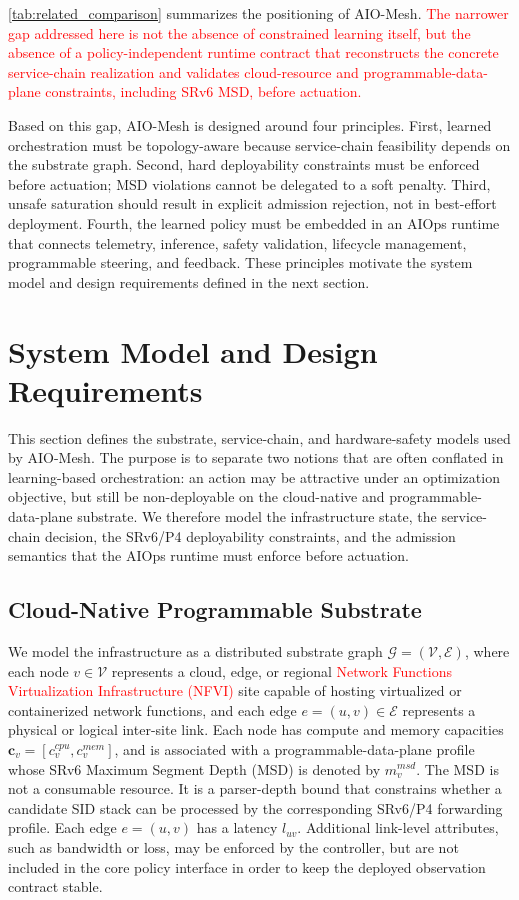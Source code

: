 \documentclass[final,5p]{elsarticle}
\newcommand{\rev}[1]{\textcolor{red}{#1}}
\begin{document}
\autoref{tab:related_comparison} summarizes the positioning of AIO-Mesh. \rev{The narrower gap addressed here is not the absence of constrained learning itself, but the absence of a policy-independent runtime contract that reconstructs the concrete service-chain realization and validates cloud-resource and programmable-data-plane constraints, including SRv6 MSD, before actuation.}

Based on this gap, AIO-Mesh is designed around four principles. First, learned orchestration must be topology-aware because service-chain feasibility depends on the substrate graph. Second, hard deployability constraints must be enforced before actuation; MSD violations cannot be delegated to a soft penalty. Third, unsafe saturation should result in explicit admission rejection, not in best-effort deployment. Fourth, the learned policy must be embedded in an AIOps runtime that connects telemetry, inference, safety validation, lifecycle management, programmable steering, and feedback. These principles motivate the system model and design requirements defined in the next section.


\section{System Model and Design Requirements}
\label{sec:system_model}

This section defines the substrate, service-chain, and hardware-safety models used by AIO-Mesh. The purpose is to separate two notions that are often conflated in learning-based orchestration: an action may be attractive under an optimization objective, but still be non-deployable on the cloud-native and programmable-data-plane substrate. We therefore model the infrastructure state, the service-chain decision, the SRv6/P4 deployability constraints, and the admission semantics that the AIOps runtime must enforce before actuation.

\subsection{Cloud-Native Programmable Substrate}
\label{subsec:infrastructure_model}

We model the infrastructure as a distributed substrate graph $ \mathcal{G}=(\mathcal{V},\mathcal{E})$,
where each node \(v\in\mathcal{V}\) represents a cloud, edge, or regional \rev{Network Functions Virtualization Infrastructure (NFVI)} site capable of hosting virtualized or containerized network functions, and each edge \(e=(u,v)\in\mathcal{E}\) represents a physical or logical inter-site link. Each node has compute and memory capacities $\mathbf{c}_v=\left[c_v^{cpu},c_v^{mem}\right]$,
and is associated with a programmable-data-plane profile whose SRv6 Maximum Segment Depth (MSD) is denoted by \(m_v^{msd}\). The MSD is not a consumable resource. It is a parser-depth bound that constrains whether a candidate SID stack can be processed by the corresponding SRv6/P4 forwarding profile. Each edge \(e=(u,v)\) has a latency \(l_{uv}\). Additional link-level attributes, such as bandwidth or loss, may be enforced by the controller, but are not included in the core policy interface in order to keep the deployed observation contract stable.
\end{document}
